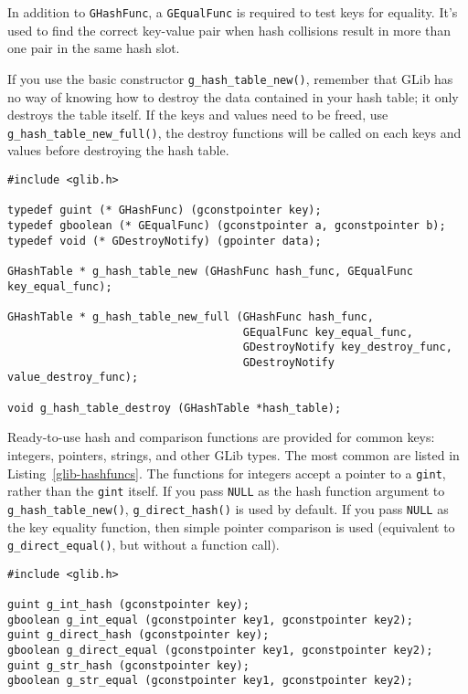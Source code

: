 In addition to \lstinline{GHashFunc}, a \lstinline{GEqualFunc} is required to test keys for equality. It's used to find the correct key-value pair when hash collisions result in more than one pair in the same hash slot.

If you use the basic constructor \lstinline{g_hash_table_new()}, remember that GLib has no way of knowing how to destroy the data contained in your hash table; it only destroys the table itself. If the keys and values need to be freed, use \lstinline{g_hash_table_new_full()}, the destroy functions will be called on each keys and values before destroying the hash table.

\begin{lstlisting}[float, caption={\lstinline{GHashTable} constructors and destructor}, label=glib-hashnew]
#include <glib.h>

typedef guint (* GHashFunc) (gconstpointer key);
typedef gboolean (* GEqualFunc) (gconstpointer a, gconstpointer b);
typedef void (* GDestroyNotify) (gpointer data);

GHashTable * g_hash_table_new (GHashFunc hash_func, GEqualFunc key_equal_func);

GHashTable * g_hash_table_new_full (GHashFunc hash_func,
                                    GEqualFunc key_equal_func,
                                    GDestroyNotify key_destroy_func,
                                    GDestroyNotify value_destroy_func);

void g_hash_table_destroy (GHashTable *hash_table);
\end{lstlisting}

Ready-to-use hash and comparison functions are provided for common keys: integers, pointers, strings, and other GLib types. The most common are listed in Listing~\ref{glib-hashfuncs}. The functions for integers accept a pointer to a \lstinline{gint}, rather than the \lstinline{gint} itself. If you pass \lstinline{NULL} as the hash function argument to \lstinline{g_hash_table_new()}, \lstinline{g_direct_hash()} is used by default. If you pass \lstinline{NULL} as the key equality function, then simple pointer comparison is used (equivalent to \lstinline{g_direct_equal()}, but without a function call).

\begin{lstlisting}[float, caption={Pre-written hashes/comparisons}, label=glib-hashfuncs]
#include <glib.h>

guint g_int_hash (gconstpointer key);
gboolean g_int_equal (gconstpointer key1, gconstpointer key2);
guint g_direct_hash (gconstpointer key);
gboolean g_direct_equal (gconstpointer key1, gconstpointer key2);
guint g_str_hash (gconstpointer key);
gboolean g_str_equal (gconstpointer key1, gconstpointer key2);
\end{lstlisting}

